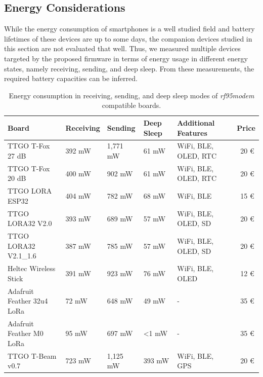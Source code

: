 \subsection{Energy Considerations}
While the energy consumption of smartphones is a well studied field and battery lifetimes of these devices are up to some days, the companion devices studied in this section are not evaluated that well.
Thus, we measured multiple devices targeted by the proposed firmware in terms of energy usage in different energy states, namely receiving, sending, and deep sleep.
From these measurements, the required battery capacities can be inferred.
%
\begin{table}[ht!]
    \centering
    \footnotesize
    \begin{tabularx}{\textwidth}{Xlllll}
        \toprule
        \textbf{Board}             & \textbf{Receiving} & \textbf{Sending} & \textbf{Deep Sleep} & \textbf{Additional Features} & \textbf{Price} \\
        \midrule
        TTGO T-Fox 27 dB           & 392 mW          & 1,771 mW      & 61 mW            & WiFi, BLE, OLED, RTC & ~20 €         \\
        TTGO T-Fox 20 dB           & 400 mW          & 902 mW        & 61 mW            & WiFi, BLE, OLED, RTC & ~20 €         \\
        TTGO LORA ESP32            & 404 mW          & 782 mW        & 68 mW            & WiFi, BLE & ~15 €                   \\
        TTGO LORA32 V2.0           & 393 mW          & 689 mW        & 57 mW            & WiFi, BLE, OLED, SD & ~20 €         \\
        TTGO LORA32 V2.1\_1.6      & 387 mW          & 785 mW        & 57 mW            & WiFi, BLE, OLED, SD & ~20  €          \\
        Heltec Wireless Stick      & 391 mW          & 923 mW        & 76 mW            & WiFi, BLE, OLED  & ~12  €            \\
        Adafruit Feather 32u4 LoRa & 72 mW           & 648 mW        & 49 mW            & -   & ~35  €                           \\
        Adafruit Feather M0 LoRa   & 95 mW           & 697 mW        & \textless 1 mW   & -    & ~35  €                          \\
        TTGO T-Beam v0.7           & 723 mW          & 1,125 mW      & 393 mW           & WiFi, BLE, GPS  & ~20  €             \\
        \bottomrule
\end{tabularx}
\caption{Energy consumption in receiving, sending, and deep sleep modes of \textit{rf95modem} compatible boards.}
\label{hoechst2020lora:tab:energy}
\end{table}
%

